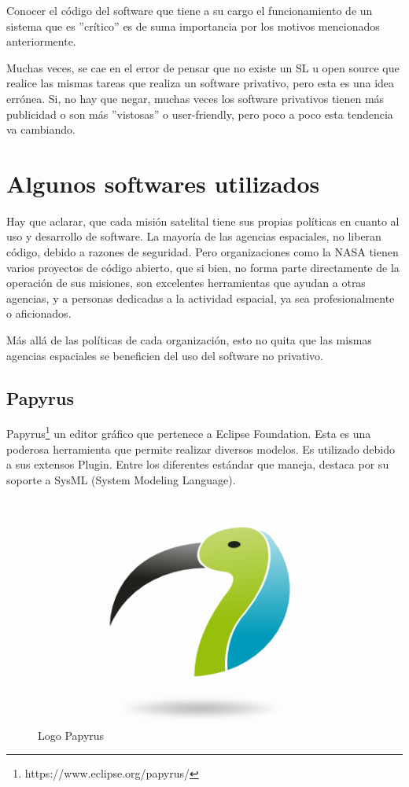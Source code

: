 \documentclass[12pt]{article}
\begin{document}
Conocer el código del software que tiene a su cargo el funcionamiento de un sistema que es ''crítico'' es de suma importancia por los motivos mencionados anteriormente. 

Muchas veces, se cae en el error de pensar que no existe un SL u open source que realice las mismas tareas que realiza un software privativo, pero esta es una idea errónea. Si, no hay que negar, muchas veces los software privativos tienen más publicidad o son más ''vistosas'' o user-friendly, pero poco a poco esta tendencia va cambiando. 

\section{Algunos softwares utilizados}
Hay que aclarar, que cada misión satelital tiene sus propias políticas en cuanto al uso y desarrollo de software. La mayoría de las agencias espaciales, no liberan código, debido a razones de seguridad. Pero organizaciones como la NASA tienen varios proyectos de código abierto, que si bien, no forma parte directamente de la operación de sus misiones, son excelentes herramientas que ayudan a otras agencias, y a personas dedicadas a la actividad espacial, ya sea profesionalmente o aficionados. 

Más allá de las políticas de cada organización, esto no quita que las mismas agencias espaciales se beneficien del uso del software no privativo. 

\subsection{Papyrus}
Papyrus\footnote{https://www.eclipse.org/papyrus/} un editor gráfico que pertenece a Eclipse Foundation. Esta es una poderosa herramienta que permite realizar diversos modelos. Es utilizado debido a sus extensos Plugin. Entre los diferentes estándar que maneja, destaca por su soporte a SysML (System Modeling Language).

\begin{figure}[H]
	\centering
	\includegraphics[width=0.7\linewidth]{papyrus}
	\caption{Logo Papyrus}
	\label{fig:papyrus}
\end{figure}
\end{document}
